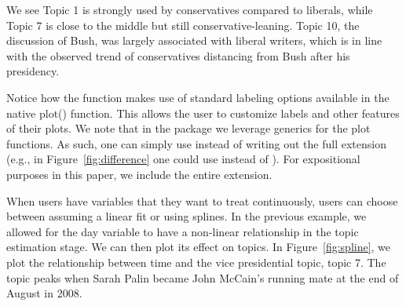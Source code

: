 \documentclass[article,shortnames]{jss}
\begin{document}
We see Topic 1 is strongly used by conservatives compared to liberals, while Topic 7 is close to the middle but still conservative-leaning. Topic 10, the discussion of Bush, was largely associated with liberal writers, which is in line with the observed trend of conservatives distancing from Bush after his presidency.

Notice how the function makes use of standard labeling options available in the native plot() function. This allows the user to customize labels and other features of their plots. We note that in the package we leverage generics for the plot functions. As such, one can simply use  instead of writing out the full extension (e.g., in Figure~\ref{fig:difference} one could use  instead of ). For expositional purposes in this paper, we include the entire extension.

When users have variables that they want to treat continuously, users can choose between assuming a linear fit or using splines. In the previous example, we allowed for the day variable to have a non-linear relationship in the topic estimation stage. We can then plot its effect on topics. In Figure~\ref{fig:spline}, we plot the relationship between time and the vice presidential topic, topic 7.  The topic peaks when Sarah Palin became John McCain's running mate at the end of August in 2008.
\end{document}
